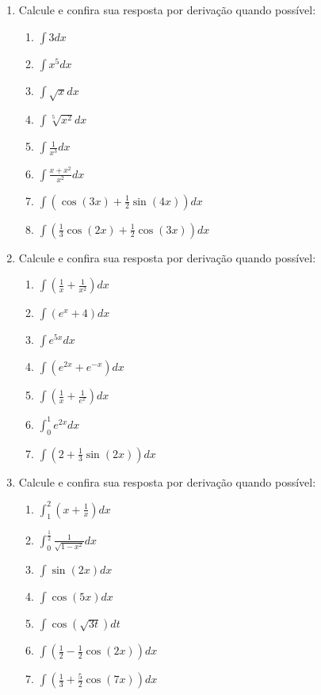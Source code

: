 \documentclass[oneside,a4paper,12pt]{article}
\begin{document}
\begin{enumerate}
	\item Calcule e confira sua resposta por derivação quando possível:
	\begin{multicols}{2}
		\begin{enumerate}
			\item $\displaystyle \int 3dx$
			\item $\displaystyle \int x^5 dx$
			\item $\displaystyle \int \sqrt{x}dx$
			\item $\displaystyle \int \sqrt[5]{x^2}dx$
			\item $\displaystyle \int \frac{1}{x^3}dx$
			\item $\displaystyle \int \frac{x+x^2}{x^2}dx$
			\item $\displaystyle \int \left( \cos(3x) + \frac{1}{2}\sin(4x)  \right)dx$
			\item $\displaystyle \int \left( \frac{1}{3}\cos(2x)+\frac{1}{2}\cos(3x) \right)dx$
		\end{enumerate}
	\end{multicols}
		
	\item Calcule e confira sua resposta por derivação quando possível:
	\begin{multicols}{2}
		\begin{enumerate}
			\item $\displaystyle \int (\frac{1}{x} + \frac{1}{x^2})dx$
			\item $\displaystyle \int (e^x + 4)dx$
			\item $\displaystyle \int e^{5x}dx$
			\item $\displaystyle \int (e^{2x}+e^{-x})dx$
			\item $\displaystyle \int (\frac{1}{x}+\frac{1}{e^x})dx$
			\item $\displaystyle \int_{0}^{1}{e^{2x}}dx$ 
			\item $\displaystyle \int \left( 2 + \frac{1}{3}\sin(2x) \right)dx$
		\end{enumerate}
	\end{multicols}	
		
	\item Calcule e confira sua resposta por derivação quando possível:	
	\begin{multicols}{2}
		\begin{enumerate}
			\item $\displaystyle \int_{1}^{2}\left(x +\frac{1}{x} \right)dx$
			\item $\displaystyle \int_{0}^{\frac{1}{2}}\frac{1}{\sqrt{1-x^2}}dx$
			\item $\displaystyle \int \sin(2x)dx$
			\item $\displaystyle \int \cos(5x)dx$
			\item $\displaystyle \int \cos(\sqrt{3t})dt$
			\item $\displaystyle \int \left( \frac{1}{2} - \frac{1}{2}\cos(2x) \right)dx$
			\item $\displaystyle \int \left( \frac{1}{3} + \frac{5}{2}\cos(7x) \right)dx$
		\end{enumerate}
	\end{multicols}
		

\end{enumerate}
\end{document}
